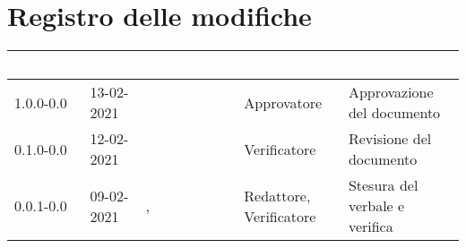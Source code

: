 \section*{Registro delle modifiche}
{
\setcounter{table}{-1}
{
\renewcommand{\arraystretch}{1.5}
\centering
\begin{longtable}{C{1.7cm} C{2.5cm} C{3.2cm} C{2.7cm} C{4.8cm}}
\textcolor{white}{\textbf{Versione}}&
\textcolor{white}{\textbf{Data}}&
\textcolor{white}{\textbf{Nominativo}}&
\textcolor{white}{\textbf{Ruolo}}&
\textcolor{white}{\textbf{Descrizione}}\\	
\endhead

1.0.0-0.0 & 13-02-2021 & \Approvatore{} & Approvatore & Approvazione del documento\\	
0.1.0-0.0 & 12-02-2021 & \Verificatori{} & Verificatore & Revisione del documento\\		
0.0.1-0.0 & 09-02-2021 & \Redattori{}, \Verificatori{} & Redattore, Verificatore & Stesura del verbale e verifica\\
		
\end{longtable}
}
}
